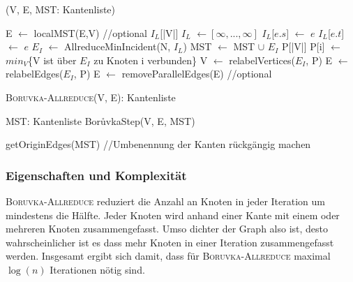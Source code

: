 \begin{algorithm} 
\caption{\boruvkaStep(V, E, MST: Kantenliste)}
\begin{algorithmic}[1]
\label{BoruvkaStep}

\STATE E $\leftarrow$ localMST(E,V) //optional
\STATE $I_L$[|V|]
\STATE $I_L$ $\gets [\infty, ..., \infty]$ 
 \label{Incident-start}
        \STATE $I_L$[$e.s$] $\gets$ $e$
    \ENDIF
        \STATE $I_L$[$e.t$] $\gets$ $e$
    \ENDIF
\ENDFOR \label{Incident-end}
\STATE $E_I$ $\leftarrow$ AllreduceMinIncident(N, $I_L$) \label{Allreduce-code}
 \label{addMST-start}
    \STATE MST $\gets$ MST $\cup$ $E_I$ 
\ENDIF \label{addMST-end}
\STATE P[|V|]
 \label{parent-start}
    \STATE P[i] $\gets$ $min_V$\{V ist über $E_I$ zu Knoten i verbunden\}
\ENDFOR \label{parent-end}
\STATE V $\gets$ relabelVertices($E_I$, P) \label{kontrahiere-start}
\STATE E $\gets$ relabelEdges($E_I$, P)\label{kontrahiere-end}
\STATE E $\gets$ removeParallelEdges(E) //optional \label{removeParallel-code}
\end{algorithmic}
\end{algorithm}



\begin{algorithm} 
\caption{\textsc{Boruvka-Allreduce}(V, E): Kantenliste}
\begin{algorithmic}[1]
\label{Boruvka-Allreduce-Algo}

\STATE MST: Kantenliste
    \STATE Bor{\r u}vkaStep(V, E, MST)
\ENDWHILE

\RETURN getOriginEdges(MST) //Umbenennung der Kanten rückgängig machen
\end{algorithmic}
\end{algorithm}


\subsubsection{Eigenschaften und Komplexität}
\textsc{Boruvka-Allreduce} reduziert die Anzahl an Knoten in jeder Iteration um mindestens die Hälfte. Jeder Knoten wird anhand einer Kante mit einem oder mehreren Knoten zusammengefasst. Umso dichter der Graph also ist, desto wahrscheinlicher ist es dass mehr Knoten in einer Iteration zusammengefasst werden. Insgesamt ergibt sich damit, dass für \textsc{Boruvka-Allreduce} maximal $\log(n)$ Iterationen nötig sind.

